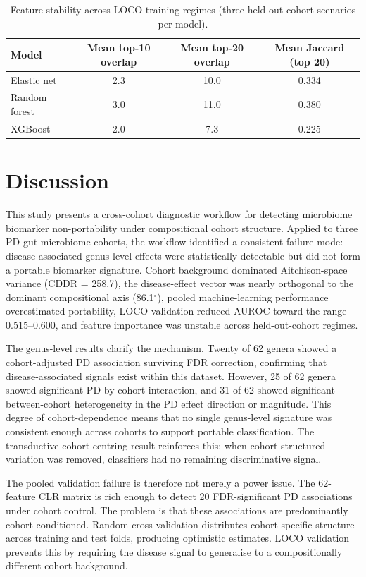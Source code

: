 \documentclass[12pt,a4paper]{article}
\begin{document}
\begin{table}[h]
\centering
\caption{Feature stability across LOCO training regimes (three held-out
cohort scenarios per model).}
\label{tab:stability}
\begin{tabular}{lccc}
\toprule
Model & Mean top-10 overlap & Mean top-20 overlap & Mean Jaccard (top 20) \\
\midrule
Elastic net   & 2.3 & 10.0 & 0.334 \\
Random forest & 3.0 & 11.0 & 0.380 \\
XGBoost       & 2.0 &  7.3 & 0.225 \\
\bottomrule
\end{tabular}
\end{table}

\section{Discussion}
\label{sec:discussion}

This study presents a cross-cohort diagnostic workflow for detecting
microbiome biomarker non-portability under compositional cohort structure.
Applied to three PD gut microbiome cohorts, the workflow identified a
consistent failure mode: disease-associated genus-level effects were
statistically detectable but did not form a portable biomarker signature.
Cohort background dominated Aitchison-space variance (CDDR = 258.7),
the disease-effect vector was nearly orthogonal to the dominant
compositional axis (86.1$^\circ$), pooled machine-learning performance
overestimated portability, LOCO validation reduced AUROC toward the range
0.515--0.600, and feature importance was unstable across held-out-cohort
regimes.

The genus-level results clarify the mechanism. Twenty of 62 genera showed
a cohort-adjusted PD association surviving FDR correction, confirming that
disease-associated signals exist within this dataset. However, 25 of 62
genera showed significant PD-by-cohort interaction, and 31 of 62 showed
significant between-cohort heterogeneity in the PD effect direction or
magnitude. This degree of cohort-dependence means that no single genus-level
signature was consistent enough across cohorts to support portable
classification. The transductive cohort-centring result reinforces this: when
cohort-structured variation was removed, classifiers had no remaining
discriminative signal.

The pooled validation failure is therefore not merely a power issue. The
62-feature CLR matrix is rich enough to detect 20 FDR-significant PD
associations under cohort control. The problem is that these associations are
predominantly cohort-conditioned. Random cross-validation distributes
cohort-specific structure across training and test folds, producing optimistic
estimates. LOCO validation prevents this by requiring the disease signal to
generalise to a compositionally different cohort background.
\end{document}

